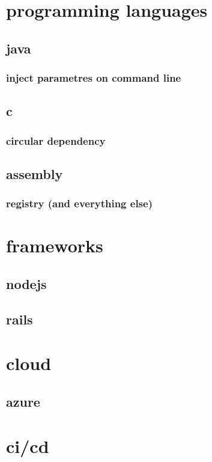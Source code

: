 \documentclass{report}
\begin{document}
\chapter{programming languages}
\section{java}
\subsection{inject parametres on command line}

\section{c}
\subsection{circular dependency}

\section{assembly}
\subsection{registry (and everything else)}


\chapter{frameworks}
\section{nodejs}
\section{rails}




\chapter{cloud}
\section{azure}

\chapter{ci/cd}
\end{document}
